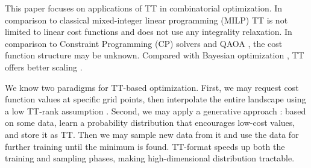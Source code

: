 \documentclass{article}
\theoremstyle{plain}
\theoremstyle{definition}
\theoremstyle{remark}
\begin{document}
This paper focuses on applications of TT in combinatorial optimization. 
In comparison to classical mixed-integer linear programming (MILP)
TT is not limited to linear cost functions and does not use any integrality relaxation. In comparison to Constraint Programming (CP) solvers 
\cite{biere2009handbook} 
and QAOA \cite{farhi2014quantum}, the cost function structure may be unknown. Compared with Bayesian optimization \cite{jones1998efficient}, TT offers better scaling 
. 

We know two paradigms for TT-based optimization. First, we may request cost function values at specific grid points, then interpolate the entire landscape using a low TT-rank assumption \cite{zheltkov2019global, sozykin2022ttopt}. 
Second, we may apply a generative approach \cite{batsheva2023protes}: based on some data, learn a probability distribution that encourages low-cost values, and store it as TT. Then we may sample new data from it and use the data for further training until the minimum is found. TT-format
speeds up both the training and sampling phases, making high-dimensional distribution tractable.
\end{document}
